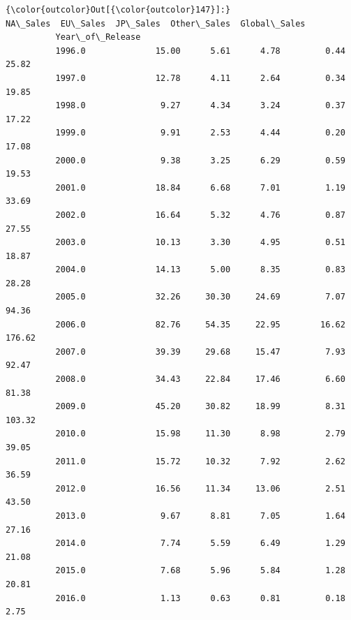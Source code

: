 \documentclass[11pt]{article}
\begin{document}
\begin{Verbatim}[commandchars=\\\{\}]
{\color{outcolor}Out[{\color{outcolor}147}]:}                  NA\_Sales  EU\_Sales  JP\_Sales  Other\_Sales  Global\_Sales
          Year\_of\_Release                                                         
          1996.0              15.00      5.61      4.78         0.44         25.82
          1997.0              12.78      4.11      2.64         0.34         19.85
          1998.0               9.27      4.34      3.24         0.37         17.22
          1999.0               9.91      2.53      4.44         0.20         17.08
          2000.0               9.38      3.25      6.29         0.59         19.53
          2001.0              18.84      6.68      7.01         1.19         33.69
          2002.0              16.64      5.32      4.76         0.87         27.55
          2003.0              10.13      3.30      4.95         0.51         18.87
          2004.0              14.13      5.00      8.35         0.83         28.28
          2005.0              32.26     30.30     24.69         7.07         94.36
          2006.0              82.76     54.35     22.95        16.62        176.62
          2007.0              39.39     29.68     15.47         7.93         92.47
          2008.0              34.43     22.84     17.46         6.60         81.38
          2009.0              45.20     30.82     18.99         8.31        103.32
          2010.0              15.98     11.30      8.98         2.79         39.05
          2011.0              15.72     10.32      7.92         2.62         36.59
          2012.0              16.56     11.34     13.06         2.51         43.50
          2013.0               9.67      8.81      7.05         1.64         27.16
          2014.0               7.74      5.59      6.49         1.29         21.08
          2015.0               7.68      5.96      5.84         1.28         20.81
          2016.0               1.13      0.63      0.81         0.18          2.75
\end{Verbatim}
            
\end{document}
